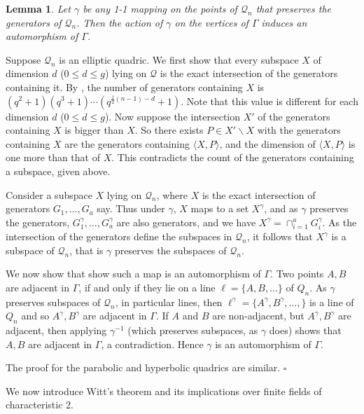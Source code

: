 \documentclass[12pt]{article}
\newtheorem{lemma}[theorem]{Lemma}
\newenvironment{proof}{\noindent{\bf Proof}\hspace{0.5em}}
    { \null  \hfill $\square$ \par}
\newcommand{\Q}{\mathscr Q}
\newcommand{\Label}{\label}
\begin{document}
\begin{lemma}\Label{gen-aut}
Let $\gamma$ be any 1-1 mapping on the points of $\Q_n$ that preserves the generators of $\Q_n$.  Then the action of $\gamma$ on the vertices of $\Gamma$ induces an automorphism of $\Gamma$.
\end{lemma}
\begin{proof}Suppose $\Q_n$ is an elliptic quadric.
We first show that every subspace $X$ of dimension $d$ ($0\le d\le g$) lying on $\Q$ is the exact intersection of the generators containing it. By \cite[Theorem 22.4.7]{HT}, the number of generators containing $X$ is $(q^2+1)(q^3+1)\cdots(q^{\frac12(n-1)-d}+1)$. Note that this value is different for each dimension $d$ ($0\le d\le g$). Now suppose the intersection $X'$ of the generators containing $X$ is bigger than $X$.  So there exists $P\in X'\backslash X$ with the generators containing $X$ are the generators containing $\langle X,P\rangle$, and the dimension of $\langle X,P\rangle$ is one more than that of $X$.  This contradicts the count of the generators containing a subspace, given above.

Consider a subspace $X$ lying on $\Q_n$, where $X$ is the exact intersection of generators $G_1,\ldots,G_a$ say.  Thus under $\gamma$, $X$ maps to a set $X^\gamma$, and as $\gamma$ preserves the generators, $G_1^\gamma,\ldots,G_a^\gamma$ are also generators, and we have $X^\gamma=\cap_{i=1}^a G_i^\gamma$. As the intersection of the generators define the subspaces in $\Q_n$, it follows that $X^\gamma$ is a subspace of $\Q_n$, that is $\gamma$ preserves the subspaces of $\Q_n$. 

We now show that show such a map is an automorphism of $\Gamma$. Two points $A,B$  are adjacent in $\Gamma$, if and only if they lie on a line $\ell=\{A,B,\ldots\}$ of $Q_n$. As $\gamma$ preserves subspaces of $\Q_n$, in particular lines, then $\ell^\gamma=\{A^\gamma,B^\gamma,\ldots,\}$ is a line of $Q_n$ and so $A^\gamma,B^\gamma$ are adjacent in $\Gamma$. If $A$ and $B$ are non-adjacent, but $A^\gamma,B^\gamma$ are  adjacent, then applying $\gamma^{-1}$ (which preserves subspaces, as $\gamma$ does)  shows that $A,B$ are adjacent in $\Gamma$, a contradiction. Hence $\gamma$ is an automorphism of $\Gamma$.

The proof for the parabolic and hyperbolic quadrics are similar.
\end{proof}


We now introduce Witt's theorem and its implications over finite fields of characteristic 2. 
\end{document}
